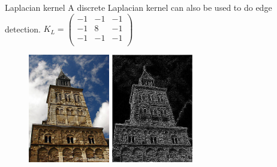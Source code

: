 \documentclass{beamer}
\begin{document}
\begin{frame}{Laplacian kernel}
A discrete Laplacian kernel can also be used to do edge detection. 
$K_L = \begin{pmatrix}
	-1 & -1 & -1\\
	-1 & 8 & -1\\
	-1 & -1 & -1\\
\end{pmatrix}$
\begin{figure}[ht]
\includegraphics[width=1.4in]{churchin.jpg}
\hspace{.1in}
\includegraphics[width=1.4in]{churchoutlaplace.jpg}
\hspace{.1in}
\end{figure}

\end{frame}
\end{document}
